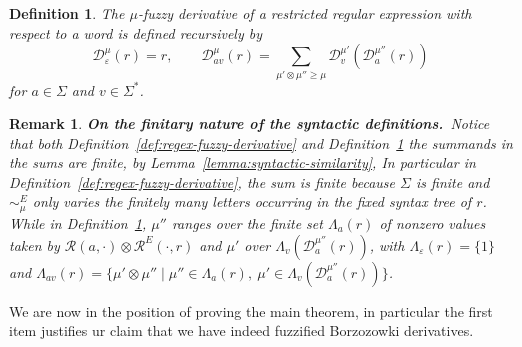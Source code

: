 \documentclass{article}
\newcommand{\cR}{{\mathcal R}}
\def\cut{\mu}
\newtheorem{definition}{Definition}[section]
\newtheorem{remark}{Remark}[section]
\begin{document}
\begin{definition}\label{def:regex-fuzzy-word-derivative}
The $\mu$-fuzzy derivative of a restricted regular expression with respect to a word is defined
recursively by
\[
  \mathcal D_\varepsilon^\cut(r)=r,
  \qquad
  \mathcal D_{av}^\cut(r)=\sum_{\mu'\otimes\mu''\geq \mu}\mathcal D_v^{\cut'}(\mathcal D_a^{\cut''}(r))
\]
for $a\in\Sigma$ and $v\in\Sigma^*$.
\end{definition}
\begin{remark} {\bf On the finitary nature of the syntactic definitions.}\ {\em Notice that both Definition~\ref{def:regex-fuzzy-derivative} and Definition~\ref{def:regex-fuzzy-word-derivative} the summands in the sums are finite, by Lemma~\ref{lemma:syntactic-similarity}, 
In particular in Definition~\ref{def:regex-fuzzy-derivative}, the sum is finite because $\Sigma$ is finite
and $\sim_\cut^E$ only varies the finitely many letters occurring in the fixed
syntax tree of $r$. While in Definition~\ref{def:regex-fuzzy-word-derivative}, $\cut''$ ranges over the finite set $\Lambda_a(r)$ of nonzero values taken by $\cR(a,\cdot)\otimes\cR^E(\cdot,r)$ and $\cut'$ over $\Lambda_v(\mathcal D_a^{\cut''}(r))$, with $\Lambda_\varepsilon(r)=\{1\}$ and $\Lambda_{av}(r)=\{\cut'\otimes\cut''\mid \cut''\in\Lambda_a(r),\ \cut'\in\Lambda_v(\mathcal D_a^{\cut''}(r))\}$.
}
\end{remark}
 
We are now in the position of proving the main theorem, in particular the first item justifies ur claim that we have indeed fuzzified Borzozowki derivatives.
\end{document}
